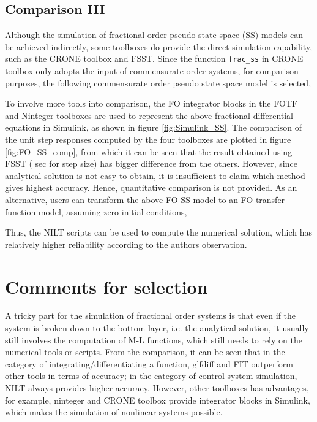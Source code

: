 \documentclass[11pt]{tCON2e}
\theoremstyle{plain}\newtheorem{theorem}{Theorem}
\theoremstyle{definition}
\theoremstyle{remark}
\begin{document}
\subsection{Comparison III}
Although the simulation of fractional order pseudo state space (SS) models can be achieved indirectly, some toolboxes do provide the direct simulation capability, such as the CRONE toolbox and FSST. Since the function {\tt frac\_ss} in CRONE toolbox only adopts the input of commensurate order systems, for comparison purposes, the following commensurate order pseudo state space model is selected,

To involve more tools into comparison, the FO integrator blocks in the FOTF and Ninteger toolboxes are used to represent the above fractional differential equations in Simulink, as shown in figure \ref{fig:Simulink_SS}. The comparison of the unit step responses computed by the four toolboxes are plotted in figure \ref{fig:FO_SS_comp}, from which it can be seen that the result obtained using FSST ( sec for step size) has bigger difference from the others. However, since analytical solution is not easy to obtain, it is insufficient to claim which method gives highest accuracy. Hence, quantitative comparison is not provided. As an alternative, users can transform the above FO SS model to an FO transfer function model, assuming zero initial conditions,

Thus, the NILT scripts can be used to compute the numerical solution, which has relatively higher reliability according to the authors observation.




\section{Comments for selection}
\label{sec:com_for_sel}
A tricky part for the simulation of fractional order systems is that even if the system is broken down to the bottom layer, i.e. the analytical solution, it usually still involves the computation of M-L functions, which still needs to rely on the numerical tools or scripts.
From the comparison, it can be seen that in the category of integrating/differentiating a function, glfdiff and FIT outperform other tools in terms of accuracy; in the category of control system simulation, NILT always provides higher accuracy. However, other toolboxes has advantages, for example, ninteger and CRONE toolbox provide integrator blocks in Simulink, which makes the simulation of nonlinear systems possible.
\end{document}
